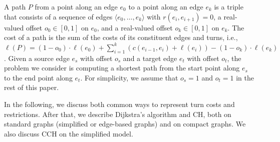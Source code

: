\documentclass[a4paper, english, cleveref]{lipics-v2021}
\begin{document}
A path $P$ from a point along an edge $e_0$ to a point along an edge $e_k$ is a triple that consists of a sequence of edges $\langle e_0, \dots, e_k \rangle$ with $r(e_i, e_{i + 1}) = 0$, a real-valued offset $o_0 \in [0, 1]$ on $e_0$, and a real-valued offset $o_k \in [0, 1]$ on $e_k$. The cost of a path is the sum of the costs of its constituent edges and turns, i.e., $\ell(P) = (1 - o_0) \cdot \ell(e_0) + \sum_{i = 1}^k (c(e_{i - 1}, e_i) + \ell(e_i)) - (1 - o_k) \cdot \ell(e_k)$. Given a source edge $e_s$ with offset $o_s$ and a target edge $e_t$ with offset $o_t$, the problem we consider is computing a shortest path from the start point along $e_s$ to the end point along $e_t$. For simplicity, we assume that $o_s = 1$ and $o_t = 1$ in the rest of this paper.

In the following, we discuss both common ways to represent turn costs and restrictions. After that, we describe Dijkstra's algorithm and CH, both on standard graphs (simplified or edge-based graphs) and on compact graphs. We also discuss CCH on the simplified model.



\end{document}
